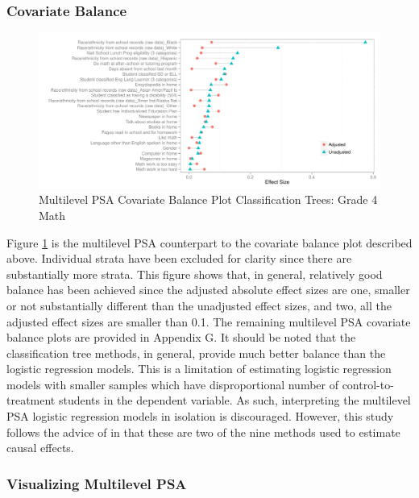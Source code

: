 \documentclass[letterpaper,12p,twoside]{article} %
\begin{document}
\subsubsection{Covariate Balance}

\begin{figure}[t]
\begin{center}
\includegraphics[width=\textwidth]{../Figures2009/g4math-mlpsa-ctree-balance.pdf}
\caption{Multilevel PSA Covariate Balance Plot Classification Trees: Grade 4 Math}
\label{fig:g4math-mlpsa-ctree-balance}
\end{center}
\end{figure}


Figure \ref{fig:g4math-mlpsa-ctree-balance} is the multilevel PSA counterpart to the covariate balance plot described above. Individual strata have been excluded for clarity since there are substantially more strata. This figure shows that, in general, relatively good balance has been achieved since the adjusted absolute effect sizes are one, smaller or not substantially different than the unadjusted effect sizes, and two, all the adjusted effect sizes are smaller than 0.1. The remaining multilevel PSA covariate balance plots are provided in Appendix G. It should be noted that the classification tree methods, in general, provide much better balance than the logistic regression models. This is a limitation of estimating logistic regression models with smaller samples which have disproportional number of control-to-treatment students in the dependent variable. As such, interpreting the multilevel PSA logistic regression models in isolation is discouraged. However, this study follows the advice of  in that these are two of the nine methods used to estimate causal effects.


\subsubsection{Visualizing Multilevel PSA}
\end{document}
